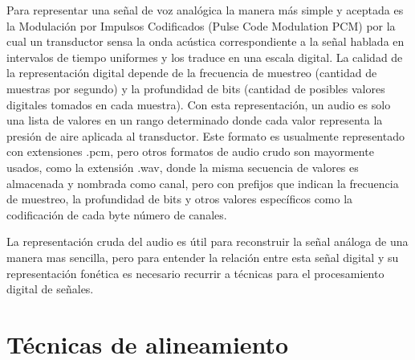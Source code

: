 Para representar una señal de voz analógica la manera más simple y aceptada es la Modulación por Impulsos Codificados (Pulse Code Modulation PCM) por la cual un transductor sensa la onda acústica correspondiente a la señal hablada en intervalos de tiempo uniformes y los traduce en una escala digital. La calidad de la representación digital depende de la frecuencia de muestreo (cantidad de muestras por segundo) y la profundidad de bits (cantidad de posibles valores digitales tomados en cada muestra). Con esta representación, un audio es solo una lista de valores en un rango determinado donde cada valor representa la presión de aire aplicada al transductor. Este formato es usualmente representado con extensiones .pcm, pero otros formatos de audio crudo son mayormente usados, como la extensión .wav, donde la misma secuencia de valores es almacenada y nombrada como canal, pero con prefijos que indican la frecuencia de muestreo, la profundidad de bits y otros valores específicos como la codificación de cada byte número de canales.

La representación cruda del audio es útil para reconstruir la señal análoga de una manera mas sencilla, pero para entender la relación entre esta señal digital y su representación fonética es necesario recurrir a técnicas para el procesamiento digital de señales.

\section{Técnicas de alineamiento}

